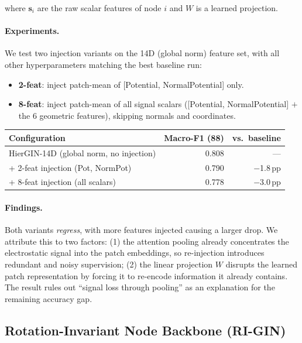 where $\mathbf{s}_i$ are the raw scalar features of node $i$ and $W$ is a
learned projection.

\paragraph{Experiments.}
We test two injection variants on the 14D (global norm) feature set, with all
other hyperparameters matching the best baseline run:
\begin{itemize}
  \item \textbf{2-feat}: inject patch-mean of [Potential, NormalPotential] only.
  \item \textbf{8-feat}: inject patch-mean of all signal scalars
        ([Potential, NormalPotential] $+$ the 6 geometric features),
        skipping normals and coordinates.
\end{itemize}

\begin{center}
  \begin{tabular}{lrr}
    \toprule
    \textbf{Configuration} & \textbf{Macro-F1 (88)} & \textbf{vs.\ baseline} \\
    \midrule
    HierGIN-14D (global norm, no injection) & 0.808 & --- \\
    + 2-feat injection (Pot, NormPot)       & 0.790 & $-$1.8\,pp \\
    + 8-feat injection (all scalars)        & 0.778 & $-$3.0\,pp \\
    \bottomrule
  \end{tabular}
\end{center}

\paragraph{Findings.}
Both variants \emph{regress}, with more features injected causing a larger
drop.
We attribute this to two factors: (1) the attention pooling already
concentrates the electrostatic signal into the patch embeddings, so
re-injection introduces redundant and noisy supervision; (2) the linear
projection $W$ disrupts the learned patch representation by forcing it to
re-encode information it already contains.
The result rules out ``signal loss through pooling'' as an explanation for
the remaining accuracy gap.

\subsection{Rotation-Invariant Node Backbone (RI-GIN)}
\label{sec:ablation:rigin}

